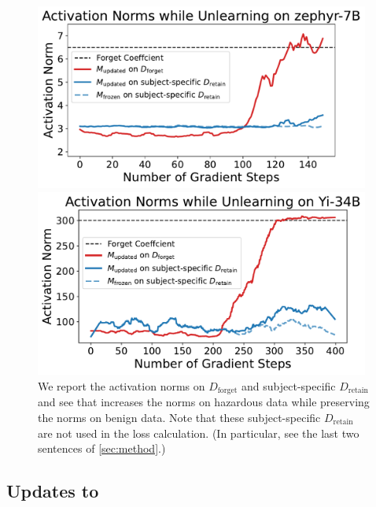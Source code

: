 \begin{figure}[b!]
    \centering
    \begin{minipage}[b]{0.48\textwidth}
        \includegraphics[width=0.98\textwidth]{figures/zephyr_cut_logs.pdf}
    \end{minipage}
    \hfill 
    \begin{minipage}[b]{0.48\textwidth}
        \includegraphics[width=0.98\textwidth]{figures/yi_cut_logs.pdf}
    \end{minipage}
    \caption{We report the activation norms on $D_\text{forget}$ and subject-specific $D_\text{retain}$ and see that \method{} increases the norms on hazardous data while preserving the norms  on benign data. Note that these subject-specific $D_\text{retain}$ are not used in the loss calculation. (In particular, see the last two sentences of \cref{sec:method}.)}
    \label{fig:norms}
\end{figure}

\subsection{Updates to \method{}}\label{app:results-updates}

